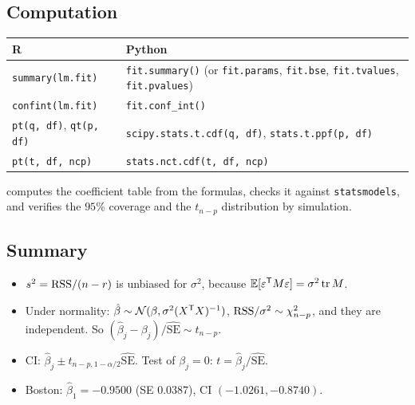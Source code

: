 \subsection{Computation}
\begin{center}\small
\begin{tabular}{@{}>{\raggedright\arraybackslash}p{6.5cm}>{\raggedright\arraybackslash}p{8.9cm}@{}}\hline
R & Python\\\hline
\texttt{summary(lm.fit)} & \texttt{fit.summary()} (or \texttt{fit.params}, \texttt{fit.bse}, \texttt{fit.tvalues}, \texttt{fit.pvalues})\\
\texttt{confint(lm.fit)} & \texttt{fit.conf\_int()}\\
\texttt{pt(q, df)}, \texttt{qt(p, df)} & \texttt{scipy.stats.t.cdf(q, df)}, \texttt{stats.t.ppf(p, df)}\\
\texttt{pt(t, df, ncp)} & \texttt{stats.nct.cdf(t, df, ncp)}\\\hline
\end{tabular}
\end{center}
 computes the coefficient table from the formulas, checks it against
\texttt{statsmodels}, and verifies the $95\%$ coverage and the $t_{n-p}$ distribution by simulation.

\subsection{Summary}
\begin{itemize}
  \item $s^2=\mathrm{RSS}/(n-r)$ is unbiased for $\sigma^2$, because $\mathbb E[\varepsilon^{\mathsf T} M\varepsilon]=\sigma^2\operatorname{tr} M$.
  \item Under normality: $\hat\beta\sim\mathcal N(\beta,\sigma^2(X^{\mathsf T} X)^{-1})$, $\mathrm{RSS}/\sigma^2\sim\chi^2_{n-p}$, and they are independent. So $(\hat\beta_j-\beta_j)/\widehat{\mathrm{SE}}\sim t_{n-p}$.
  \item CI: $\hat\beta_j\pm t_{n-p,1-\alpha/2}\widehat{\mathrm{SE}}$. Test of $\beta_j=0$: $t=\hat\beta_j/\widehat{\mathrm{SE}}$.
  \item Boston: $\hat\beta_1=-0.9500$ (SE $0.0387$), CI $(-1.0261,-0.8740)$.
\end{itemize}


